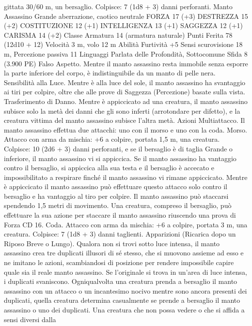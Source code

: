 \begin{multicols}{2}
gittata 30/60 m, un bersaglio.
Colpisce: 7 (1d8 + 3) danni perforanti.
Manto Assassino
Grande aberrazione, caotico neutrale
FORZA 17 (+3)
DESTREZZA 15 (+2)
COSTITUZIONE 12 (+1)
INTELLIGENZA 13 (+1)
SAGGEZZA 12 (+1)
CARISMA 14 (+2)
Classe Armatura 14 (armatura naturale)
Punti Ferita 78 (12d10 + 12)
Velocità 3 m, volo 12 m
Abilità Furtività +5
Sensi scurovisione 18 m, Percezione passiva 11
Linguaggi Parlata delle Profondità, Sottocomune
Sfida 8 (3.900 PE)
Falso Aspetto. Mentre il manto assassino resta immobile senza
esporre la parte inferiore del corpo, è indistinguibile da un manto
di pelle nera.
Sensibilità alla Luce. Mentre è alla luce del sole, il manto
assassino ha svantaggio ai tiri per colpire, oltre che alle prove di
Saggezza (Percezione) basate sulla vista.
Trasferimento di Danno. Mentre è appiccicato ad una creatura,
il manto assassino subisce solo la metà dei danni che gli sono
inferti (arrotondare per difetto), e la creatura vittima del manto
assassino subisce l’altra metà.
Azioni
Multiattacco. Il manto assassino effettua due attacchi: uno con il
morso e uno con la coda.
Morso. Attacco con arma da mischia: +6 a colpire, portata 1,5
m, una creatura.
Colpisce: 10 (2d6 + 3) danni perforanti, e se il bersaglio è di
taglia Grande o inferiore, il manto assassino vi si appiccica. Se il
manto assassino ha vantaggio contro il bersaglio, si appiccica
alla sua testa e il bersaglio è accecato e impossibilitato a
respirare finché il manto assassino vi rimane appiccicato. Mentre
è appiccicato il manto assassino può effettuare questo attacco
solo contro il bersaglio e ha vantaggio al tiro per colpire. Il
manto assassino può staccarsi spendendo 1,5 metri di
movimento. Una creatura, compreso il bersaglio, può effettuare
la sua azione per staccare il manto assassino riuscendo una prova
di Forza CD 16.
Coda. Attacco con arma da mischia: +6 a colpire, portata 3 m,
una creatura.
Colpisce: 7 (1d8 + 3) danni taglienti.
Apparizioni (Ricarica dopo un Riposo Breve o Lungo). Qualora
non si trovi sotto luce intensa, il manto assassino crea tre
duplicati illusori di sé stesso, che si muovono assieme ad esso e
ne imitano le azioni, scambiandosi di posizione per rendere
impossibile capire quale sia il reale manto assassino. Se
l'originale si trova in un’area di luce intensa, i duplicati
svaniscono.
Ogniqualvolta una creatura prenda a bersaglio il manto assassino
con un attacco o un incantesimo nocivo mentre sono ancora
presenti dei duplicati, quella creatura determina casualmente se
prende a bersaglio il manto assassino o uno dei duplicati. Una
creatura che non possa vedere o che si affida a sensi diversi dalla

\end{multicols}
